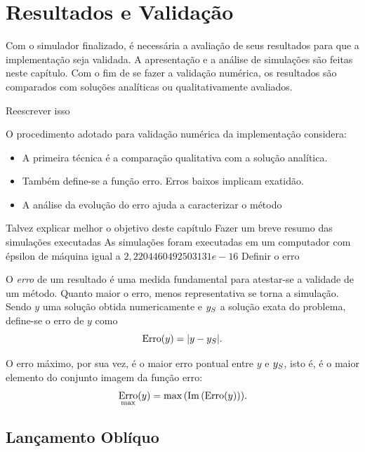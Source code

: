 \chapter{Resultados e Validação} \label{ch:results}

Com o simulador finalizado, é necessária a avaliação de seus resultados para que a implementação seja validada. A apresentação e a análise de simulações são feitas neste capítulo. Com o fim de se fazer a validação numérica, os resultados são comparados com soluções analíticas ou qualitativamente avaliados.

\alert{Reescrever isso}

O procedimento adotado para validação numérica da implementação considera:
\begin{itemize}
	\item \alert{A primeira técnica é a comparação qualitativa com a solução analítica. }
	\item \alert{Também define-se a função erro. Erros baixos implicam exatidão.}
	\item \alert{A análise da evolução do erro ajuda a caracterizar o método}
\end{itemize}

\alert{Talvez explicar melhor o objetivo deste capítulo}
\alert{Fazer um breve resumo das simulações executadas}
\alert{As simulações foram executadas em um computador com épsilon de máquina igual a \(2,2204460492503131e-16\)}
\alert{Definir o erro}

O \textit{erro} de um resultado é uma medida fundamental para atestar-se a validade de um método. Quanto maior o erro, menos representativa se torna a simulação. Sendo \(y\) uma solução obtida numericamente e \(y_S\) a solução exata do problema, define-se o erro de \(y\) como
\begin{equation*}
	\errorOf{y} = \abs{y - \analytical{y}}.
\end{equation*}

O erro máximo, por sua vez, é o maior erro pontual entre \(y\) e \(y_S\), isto é, é o maior elemento do conjunto imagem da função erro:
\begin{equation*}
	\maximumErrorOf{y} = \max\pqty{\Im\pqty{\errorOf{y}}}.
\end{equation*}

\section{Lançamento Oblíquo}

